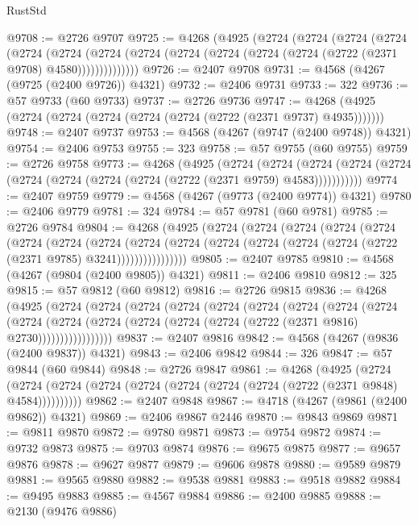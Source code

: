 \begin{lexlean}{RustStd}
\begin{coremodule}
@9708 := @2726 @9707
@9725 := @4268
    (@4925
      (@2724
        (@2724
          (@2724
            (@2724
              (@2724
                (@2724
                  (@2724 (@2724 (@2724 (@2724 (@2724 (@2724 (@2722 (@2371 @9708) @4580))))))))))))))
@9726 := @2407 @9708
@9731 := @4568 (@4267 (@9725 (@2400 @9726)) @4321)
@9732 := @2406 @9731
@9733 := 322
@9736 := @57 @9733 (@60 @9733)
@9737 := @2726 @9736
@9747 := @4268 (@4925 (@2724 (@2724 (@2724 (@2724 (@2724 (@2722 (@2371 @9737) @4935)))))))
@9748 := @2407 @9737
@9753 := @4568 (@4267 (@9747 (@2400 @9748)) @4321)
@9754 := @2406 @9753
@9755 := 323
@9758 := @57 @9755 (@60 @9755)
@9759 := @2726 @9758
@9773 := @4268
    (@4925
      (@2724
        (@2724
          (@2724 (@2724 (@2724 (@2724 (@2724 (@2724 (@2724 (@2722 (@2371 @9759) @4583)))))))))))
@9774 := @2407 @9759
@9779 := @4568 (@4267 (@9773 (@2400 @9774)) @4321)
@9780 := @2406 @9779
@9781 := 324
@9784 := @57 @9781 (@60 @9781)
@9785 := @2726 @9784
@9804 := @4268
    (@4925
      (@2724
        (@2724
          (@2724
            (@2724
              (@2724
                (@2724
                  (@2724
                    (@2724
                      (@2724
                        (@2724
                          (@2724 (@2724 (@2724 (@2724 (@2722 (@2371 @9785) @3241))))))))))))))))
@9805 := @2407 @9785
@9810 := @4568 (@4267 (@9804 (@2400 @9805)) @4321)
@9811 := @2406 @9810
@9812 := 325
@9815 := @57 @9812 (@60 @9812)
@9816 := @2726 @9815
@9836 := @4268
    (@4925
      (@2724
        (@2724
          (@2724
            (@2724
              (@2724
                (@2724
                  (@2724
                    (@2724
                      (@2724
                        (@2724
                          (@2724
                            (@2724 (@2724 (@2724 (@2724 (@2722 (@2371 @9816) @2730)))))))))))))))))
@9837 := @2407 @9816
@9842 := @4568 (@4267 (@9836 (@2400 @9837)) @4321)
@9843 := @2406 @9842
@9844 := 326
@9847 := @57 @9844 (@60 @9844)
@9848 := @2726 @9847
@9861 := @4268
    (@4925
      (@2724 (@2724 (@2724 (@2724 (@2724 (@2724 (@2724 (@2724 (@2722 (@2371 @9848) @4584))))))))))
@9862 := @2407 @9848
@9867 := @4718 (@4267 (@9861 (@2400 @9862)) @4321)
@9869 := @2406 @9867 @2446
@9870 := @9843 @9869
@9871 := @9811 @9870
@9872 := @9780 @9871
@9873 := @9754 @9872
@9874 := @9732 @9873
@9875 := @9703 @9874
@9876 := @9675 @9875
@9877 := @9657 @9876
@9878 := @9627 @9877
@9879 := @9606 @9878
@9880 := @9589 @9879
@9881 := @9565 @9880
@9882 := @9538 @9881
@9883 := @9518 @9882
@9884 := @9495 @9883
@9885 := @4567 @9884
@9886 := @2400 @9885
@9888 := @2130 (@9476 @9886)

\end{coremodule}
\end{lexlean}
